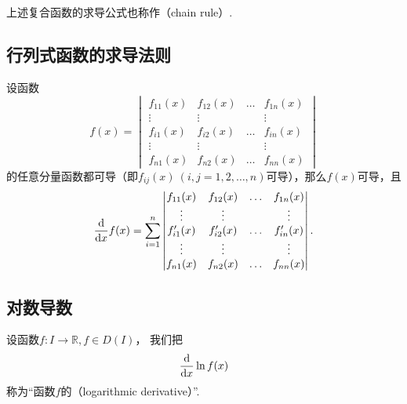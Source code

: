 上述复合函数的求导公式也称作（chain rule）.

\subsection{行列式函数的求导法则}
\begin{theorem}
\def\f#1{f_{#1}(x)}%
\def\g#1{f_{#1}'(x)}%
设函数\[
f(x) = \begin{vmatrix}
\f{11} & \f{12} & \dots & \f{1n} \\
\vdots & \vdots & & \vdots \\
\f{i1} & \f{i2} & \dots & \f{in} \\
\vdots & \vdots & & \vdots \\
\f{n1} & \f{n2} & \dots & \f{nn}
\end{vmatrix}
\]的任意分量函数都可导（即\(\f{ij}\ (i,j=1,2,\dotsc,n)\)可导），那么\(f(x)\)可导，且\[
\dv{x} f(x) = \sum_{i=1}^n \begin{vmatrix}
\f{11} & \f{12} & \dots & \f{1n} \\
\vdots & \vdots & & \vdots \\
\g{i1} & \g{i2} & \dots & \g{in} \\
\vdots & \vdots & & \vdots \\
\f{n1} & \f{n2} & \dots & \f{nn}
\end{vmatrix}.
\]
\end{theorem}

\subsection{对数导数}
\begin{definition}
设函数\(f\colon I \to \mathbb{R}, f \in D(I)\)，
我们把\[
	\dv{x} \ln f(x)
\]称为“函数\(f\)的（logarithmic derivative）”.
\end{definition}
